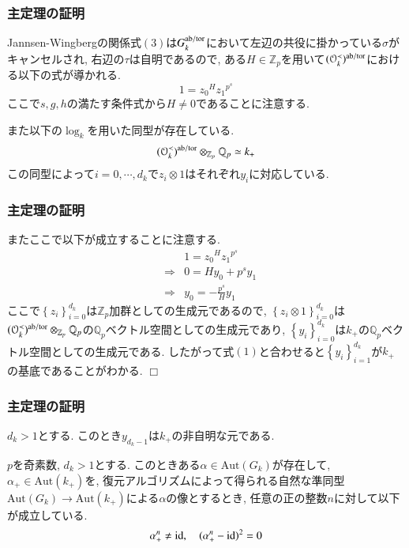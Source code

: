 \documentclass[dvipdfmx,19.8pt]{beamer}
\def\qed{\hfill $\Box$}
\theoremstyle{theorem}
\theoremstyle{definition}
\def\bZ{{\mathbb Z}}
\def\bQ{{\mathbb Q}}
\def\CalO{{\mathcal O}}
\def\Aut{{\mathrm{Aut}}}
\begin{document}
\begin{frame}[fragile]
	\frametitle{主定理の証明}
Jannsen-Wingbergの関係式$(3)$は$G_k^{\rm ab/tor}$において左辺の共役に掛かっている$\sigma$がキャンセルされ, 右辺の$\tau$は自明であるので, ある$H \in \bZ_p$を用いて$(\CalO_k^{\prec})^{\rm ab/tor}$における以下の式が導かれる. 
\[
1={z_0}^{H}{z_1}^{{p}^s}  
\]
ここで$s, g, h$の満たす条件式から$H \neq 0$であることに注意する. 

また以下の$\log_k$を用いた同型が存在している.  
\[
(\CalO_k^{\prec})^{\rm ab/tor} \otimes_{\bZ_{p}} \bQ_{p} \simeq k_+
\]
この同型によって$i=0, \cdots, d_k$で$z_i \otimes 1$はそれぞれ$y_i$に対応している. 


\end{frame}










\begin{frame}[fragile]
	\frametitle{主定理の証明}
またここで以下が成立することに注意する. 
\begin{eqnarray}
&&1={z_0}^{H}{z_1}^{{p}^s} \nonumber \\
&\Rightarrow& 0 =H{y_0}+p^s{y_1} \nonumber \\
&\Rightarrow& y_0 = - \frac{p^s}{H} y_1
\end{eqnarray}
ここで$\left\{z_i \right\}_{i=0}^{d_k}$は$\bZ_p$加群としての生成元であるので, $\left\{z_i \otimes 1 \right\}_{i=0}^{d_k}$は$(\CalO_k^{\prec})^{\rm ab/tor} \otimes_{\bZ_{p}} \bQ_{p}$の$\bQ_p$ベクトル空間としての生成元であり, $\left\{y_i \right\}_{i=0}^{d_k}$は$k_+$の$\bQ_p$ベクトル空間としての生成元である. したがって式$(1)$と合わせると$\left\{y_i \right\}_{i=1}^{d_k}$が$k_+$の基底であることがわかる. 
\qed
\end{frame}







\begin{frame}[fragile]
	\frametitle{主定理の証明}
\begin{corollary}\label{neq:cor}
$d_k >1$とする. このとき$y_{d_k-1}$は$k_+$の非自明な元である. 
\end{corollary}

\begin{theorem}\label{unipotent:theorem}
$p$を奇素数, $d_k > 1$とする. このときある$\alpha \in \Aut(G_k)$が存在して, $\alpha_+ \in \Aut(k_+)$を, 復元アルゴリズムによって得られる自然な準同型$\Aut(G_k) \rightarrow \Aut(k_+)$による$\alpha$の像とするとき, 任意の正の整数$n$に対して以下が成立している. 
\[
\alpha^n_+ \neq {\rm id}, \quad (\alpha^n_+ - {\rm id})^2 = 0
\]
\end{theorem}

\end{frame}
\end{document}
